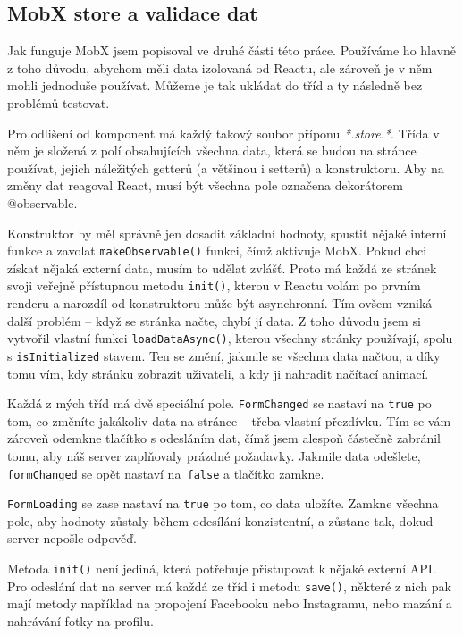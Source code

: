 \subsection{MobX store a validace dat}
Jak funguje MobX jsem popisoval ve druhé části této práce. Používáme ho hlavně z toho důvodu, abychom měli data izolovaná od Reactu, ale zároveň je v něm mohli jednoduše používat. Můžeme je tak ukládat do tříd a ty následně bez problémů testovat.

Pro odlišení od komponent má každý takový soubor příponu \textit{*.store.*}. Třída v něm je složená z polí obsahujících všechna data, která se budou na stránce používat, jejich náležitých getterů (a většinou i setterů) a konstruktoru. Aby na změny dat reagoval React, musí být všechna pole označena dekorátorem @observable.

Konstruktor by měl správně jen dosadit základní hodnoty, spustit nějaké interní funkce a zavolat \texttt{makeObservable()} funkci, čímž aktivuje MobX.
Pokud chci získat nějaká externí data, musím to udělat zvlášť. Proto má každá ze stránek svoji veřejně přístupnou metodu \texttt{init()}, kterou v Reactu volám po prvním renderu a narozdíl od konstruktoru může být asynchronní. Tím ovšem vzniká další problém – když se stránka načte, chybí jí data. Z toho důvodu jsem si vytvořil vlastní funkci \texttt{loadDataAsync()}, kterou všechny stránky používají, spolu s \texttt{isInitialized} stavem. Ten se změní, jakmile se všechna data načtou, a díky tomu vím, kdy stránku zobrazit uživateli, a kdy ji nahradit načítací animací.

Každá z mých tříd má dvě speciální pole. \texttt{FormChanged} se nastaví na \texttt{true} po tom, co změníte jakákoliv data na stránce – třeba vlastní přezdívku. Tím se vám zároveň odemkne tlačítko s odesláním dat, čímž jsem alespoň částečně zabránil tomu, aby náš server zaplňovaly prázdné požadavky. Jakmile data odešlete, \texttt{formChanged} se opět nastaví na\texttt{ false} a tlačítko zamkne.

\texttt{FormLoading} se zase nastaví na \texttt{true} po tom, co data uložíte. Zamkne všechna pole, aby hodnoty zůstaly během odesílání konzistentní, a zůstane tak, dokud server nepošle odpověď.

Metoda \texttt{init()} není jediná, která potřebuje přistupovat k nějaké externí API. Pro odeslání dat na server má každá ze tříd i metodu \texttt{save()}, některé z nich pak mají metody například na propojení Facebooku nebo Instagramu, nebo mazání a nahrávání fotky na profilu.

